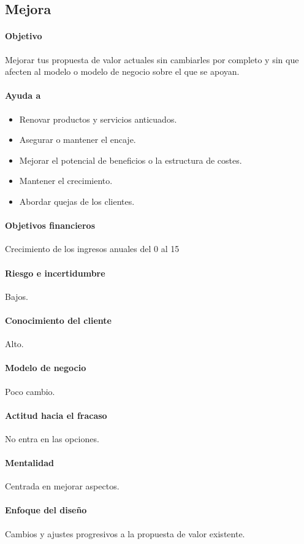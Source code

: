 \documentclass[11pt]{book}
\begin{document}
\subsection{Mejora}
\paragraph{Objetivo}
Mejorar tus propuesta de valor actuales sin cambiarles por completo y sin que afecten al modelo o modelo de negocio sobre el que se apoyan.
\paragraph{Ayuda a}
\begin{itemize}
\item Renovar productos y servicios anticuados.
\item Asegurar o mantener el encaje.
\item Mejorar el potencial de beneficios o la estructura de costes.
\item Mantener el crecimiento.
\item Abordar quejas de los clientes.
\end{itemize}
\paragraph{Objetivos financieros}
Crecimiento de los ingresos anuales del 0 al 15 %
\paragraph{Riesgo e incertidumbre}
Bajos.
\paragraph{Conocimiento del cliente}
Alto.
\paragraph{Modelo de negocio}
Poco cambio.
\paragraph{Actitud hacia el fracaso}
No entra en las opciones.
\paragraph{Mentalidad}
Centrada en mejorar aspectos.
\paragraph{Enfoque del diseño}
Cambios y ajustes progresivos a la propuesta de valor existente.
\end{document}
